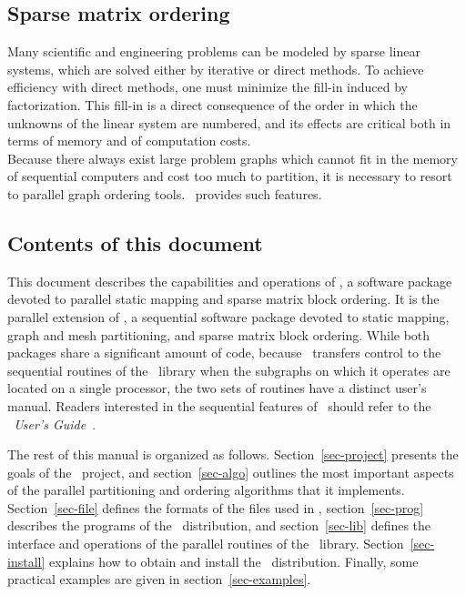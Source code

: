 \subsection{Sparse matrix ordering}

Many scientific and engineering problems can be modeled by sparse
linear systems, which are solved either by iterative or direct
methods.  To achieve efficiency with direct methods, one must minimize
the fill-in induced by factorization. This fill-in is a direct
consequence of the order in which the unknowns of the linear system
are numbered, and its effects are critical both in terms of memory and
of computation costs.
\\

Because there always exist large problem graphs which cannot fit in
the memory of sequential computers and cost too much to partition,
it is necessary to resort to parallel graph ordering tools.
\ptscotch\ provides such features.

\subsection{Contents of this document}

This document describes the capabilities and operations of \ptscotch,
a software package devoted to parallel static mapping and sparse
matrix block ordering.
It is the parallel extension of \scotch, a sequential software package
devoted to static mapping, graph and mesh partitioning, and sparse
matrix block ordering. While both packages share a significant amount
of code, because \ptscotch\ transfers control to the sequential
routines of the \libscotch\ library when the subgraphs on which it
operates are located on a single processor, the two sets of routines
have a distinct user's manual. Readers interested in the sequential
features of \scotch\ should refer to the {\it\scotch\ User's
Guide}~\scotchcitesuser.

The rest of this manual is organized as follows.
Section~\ref{sec-project} presents the goals of the \scotch\ project, and
section~\ref{sec-algo} outlines the most important aspects of the
parallel partitioning and ordering algorithms that it implements.
Section~\ref{sec-file} defines the formats of the files used in \ptscotch,
section~\ref{sec-prog} describes the programs of the
\ptscotch\ distribution, and section~\ref{sec-lib} defines the interface
and operations of the parallel routines of the \libscotch\ library.
Section~\ref{sec-install} explains how to obtain and install the
\scotch\ distribution.
Finally, some practical examples are given in
section~\ref{sec-examples}.


